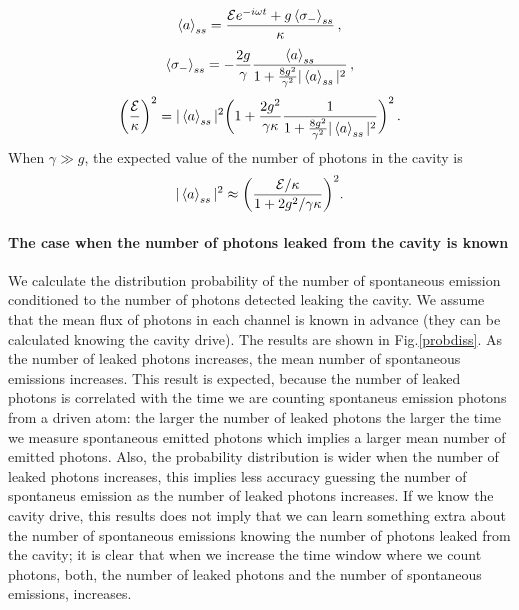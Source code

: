 \documentclass[%
 reprint,
 amsmath,amssymb,
 aps, 
]{revtex4-2}
\begin{document}
\begin{equation} \label{chaf1}
\expval{a}_{ss} = \frac{\mathcal{E}e^{-i\omega t} +
  g\expval{\sigma_-}_{ss}}{\kappa}\, ,
\end{equation}
\begin{equation} \label{chaf2}
\expval{\sigma_-}_{ss} = -\frac{2g}{\gamma}\frac{\expval{a}_{ss}}{1 +
  \frac{8g^2}{\gamma^2}|\expval{a}_{ss}|^2}\, ,
\end{equation}
\begin{equation}
\bigg(\frac{\mathcal{E}}{\kappa}\bigg)^2 = |\expval{a}_{ss}|^2 \bigg(1
+ \frac{2g^2}{\gamma \kappa}\frac{1}{1 +
  \frac{8g^2}{\gamma^2}|\expval{a}_{ss}|^2}\bigg)^2\, .
\end{equation}
When $\gamma \gg g$, the expected value of the number of photons in
the cavity is 
\begin{equation} \label{numfo}
|\expval{a}_{ss}|^2 \approx \bigg(\frac{\mathcal{E}/\kappa}{1 + 2g^2/\gamma \kappa}\bigg)^2.
\end{equation}

\paragraph{The case when the number of photons leaked from the cavity  is known}
We calculate the distribution probability of the number of spontaneous
emission conditioned to the number of photons detected leaking the
cavity. We assume that the mean flux of photons in each channel is
known in advance (they can be calculated knowing the cavity drive).
The results are shown in Fig.\ref{probdiss}. As the number of leaked
photons increases, the mean number of spontaneous emissions increases.
This result is expected, because the number of leaked photons is
correlated with the time we are counting spontaneus emission photons
from a driven atom: the larger the number of leaked photons the larger
the time we measure spontaneous emitted photons which implies a larger
mean number of emitted photons. Also, the probability distribution is
wider when the number of leaked photons increases, this implies less
accuracy guessing the number of spontaneus emission as the number of
leaked photons increases. If we know the cavity drive, this results
does not imply that we can learn something extra about the number of
spontaneous emissions knowing the number of photons leaked from the
cavity; it is clear that when we increase the time window where we
count photons, both, the number of leaked photons and the number of
spontaneous emissions, increases.
\end{document}
